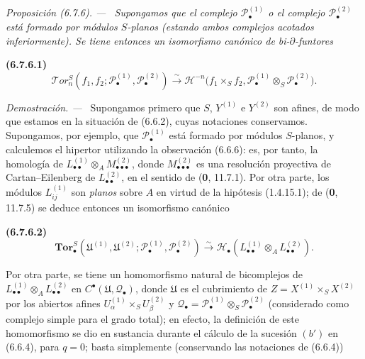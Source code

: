 \documentclass[10pt,oneside]{book}
\newcommand{\oldpage}[2][]{\setcounter{footnote}{0}\marginpar{\scriptsize\textbf{#1}~|~#2}\ignorespaces}
\newenvironment{env}[1][]{\par\medskip\noindent\textbf{(#1)}\ }{\par}
\newenvironment{proposition}[1][]{\par\medskip\noindent\itshape Proposición (#1). ---\ }{\par}
\newenvironment{proof}{\par\medskip\noindent\textit{Demostración. ---\ }}{\par}
\begin{document}
\begin{proposition}[6.7.6]
\label{III.6.7.6}
Supongamos que el complejo $\mathscr P_\bullet^{(1)}$ o el complejo
$\mathscr P_\bullet^{(2)}$ está formado por módulos $S$-planos (estando ambos
complejos acotados inferiormente). Se tiene entonces un isomorfismo canónico
de bi-$\partial$-funtores
\begin{env}[6.7.6.1]
\label{III.6.7.6.1}
\[
  \mathscr T\!or_n^S
  (f_1,f_2;\mathscr P_\bullet^{(1)},\mathscr P_\bullet^{(2)})
  \xrightarrow{\sim}
  \mathcal H^{-n}\bigl(f_1\times_S f_2,
    \mathscr P_\bullet^{(1)}\otimes_S\mathscr P_\bullet^{(2)}\bigr).
  \tag{6.7.6.1}\label{III.6.7.6.1.eq}
\]
\end{env}
\end{proposition}

\begin{proof}
Supongamos primero que $S$, $Y^{(1)}$ e $Y^{(2)}$ son afines, de modo que
estamos en la situación de (6.6.2), cuyas notaciones conservamos. Supongamos,
por ejemplo, que $\mathscr P_\bullet^{(1)}$ está formado por módulos
$S$-planos, y calculemos el hipertor utilizando la observación (6.6.6): es,
por tanto, la homología de
$L_{\bullet\bullet}^{(1)}\otimes_A M_{\bullet\bullet\bullet}^{(2)}$, donde
$M_{\bullet\bullet\bullet}^{(2)}$ es una resolución proyectiva de
Cartan--Eilenberg de $L_{\bullet\bullet}^{(2)}$, en el sentido de
(\textbf{0}, 11.7.1). Por otra parte, los módulos
$L_{ij}^{(1)}$ son \emph{planos} sobre $A$ en virtud de la hipótesis
(1.4.15.1); de (\textbf{0}, 11.7.5) se deduce entonces un isomorfismo
canónico
\begin{env}[6.7.6.2]
\label{III.6.7.6.2}
\[
  \mathbf{Tor}_\bullet^S
  (\mathfrak U^{(1)},\mathfrak U^{(2)};
   \mathscr P_\bullet^{(1)},\mathscr P_\bullet^{(2)})
  \xrightarrow{\sim}
  \mathscr H_\bullet
  (L_{\bullet\bullet}^{(1)}\otimes_A L_{\bullet\bullet}^{(2)}).
  \tag{6.7.6.2}\label{III.6.7.6.2.eq}
\]
\end{env}
Por otra parte, se tiene un homomorfismo natural de bicomplejos de
$L_{\bullet\bullet}^{(1)}\otimes_A L_{\bullet\bullet}^{(2)}$ en
$C^\bullet(\mathfrak U,\mathscr Q_\bullet)$, donde $\mathfrak U$ es el
cubrimiento de $Z=X^{(1)}\times_S X^{(2)}$ por los abiertos afines
\oldpage[III]{161}
$U_\alpha^{(1)}\times_S U_\beta^{(2)}$ y
$\mathscr Q_\bullet
=\mathscr P_\bullet^{(1)}\otimes_S\mathscr P_\bullet^{(2)}$ (considerado como
complejo simple para el grado total); en efecto, la definición de este
homomorfismo se dio en sustancia durante el cálculo de la sucesión $(b')$ en
(6.6.4), para $q=0$; basta simplemente (conservando las notaciones de (6.6.4))

\end{proof}
\end{document}
